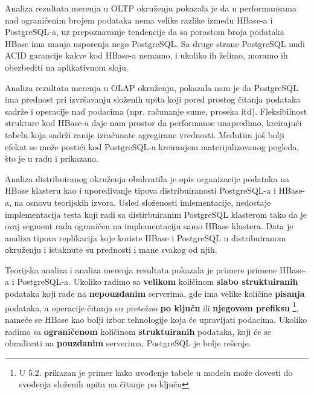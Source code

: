 \documentclass[12pt,oneside]{memoir}
\begin{document}
Analiza rezultata merenja u OLTP okruženju pokazala je da u performansama nad ograničenim brojem podataka nema velike razlike između HBase-a i PostgreSQL-a, uz prepoznavanje tendencije da sa porastom broja podataka HBase ima manja usporenja nego PostgreSQL. Sa druge strane PostgreSQL nudi ACID garancije kakve kod HBase-a nemamo, i ukoliko ih želimo, moramo ih obezbediti na aplikativnom sloju.

Analiza rezultata merenja u OLAP okruženju, pokazala nam je da PostgreSQL ima prednost pri izvršavanju složenih upita koji pored prostog čitanja podataka sadrže i operacije nad podacima (npr. računanje sume, proseka itd). Fleksibilnost strukture kod HBase-a daje nam prostor da performanse unapredimo, kreirajući tabelu koja sadrži ranije izračunate agregirane vrednosti. Međutim još bolji efekat se može postići kod PostgreSQL-a kreiranjem materijalizovanog pogleda, što je u radu i prikazano.

Analiza distribuiranog okruženja obuhvatila je opis organizacije podataka na HBase klasteru kao i upoređivanje tipova distribuiranosti PostgreSQL-a i HBase-a, na osnovu teorijskih izvora. Usled složenosti imlementacije, nedostaje implementacija testa koji radi sa distirbuiranim PostgreSQL klasterom tako da je ovaj segment rada ograničen na implementaciju samo HBase klastera. Data je analiza tipova replikacija koje koriste HBase i PostgreSQL  u distribuiranom okruženju i istaknute su prednosti i mane svakog od njih.


Teorijska analiza i analiza merenja rezultata pokazala je primere primene HBase-a i PostgreSQL-a. Ukoliko radimo sa \textbf{velikom} količinom \textbf{slabo struktuiranih} podataka koji rade na \textbf{nepouzdanim} serverima, gde ima velike količine \textbf{pisanja} podataka, a operacije čitanja su pretežno \textbf{po ključu} ili \textbf{njegovom prefiksu} \footnote{U 5.2. prikazan je primer kako uvođenje tabele u modelu može dovesti do svođenja složenih upita na čitanje po ključu}, nameće se HBase kao bolji izbor tehnologije koja će upravljati podacima. Ukoliko radimo sa \textbf{ograničenom} količinom \textbf{struktuiranih} podataka, koji će se obrađivati na \textbf{pouzdanim} serverima, PostgreSQL je bolje rešenje.
\end{document}

